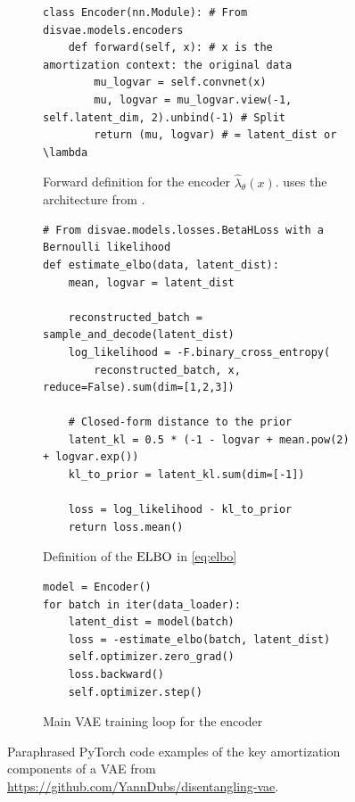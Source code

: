 \begin{figure}
  \centering
\begin{subfigure}[b]{\textwidth}
\begin{lstlisting}
class Encoder(nn.Module): # From disvae.models.encoders
    def forward(self, x): # x is the amortization context: the original data
        mu_logvar = self.convnet(x)
        mu, logvar = mu_logvar.view(-1, self.latent_dim, 2).unbind(-1) # Split
        return (mu, logvar) # = latent_dist or \lambda
\end{lstlisting}
\caption{Forward definition for the encoder $\hat \lambda_\theta(x)$.
   uses the architecture
  from \citet{burgess2018understanding}.}
\label{lst:vae.encoder}
\end{subfigure}
\begin{subfigure}[b]{\textwidth}
\begin{lstlisting}
# From disvae.models.losses.BetaHLoss with a Bernoulli likelihood
def estimate_elbo(data, latent_dist):
    mean, logvar = latent_dist

    reconstructed_batch = sample_and_decode(latent_dist)
    log_likelihood = -F.binary_cross_entropy(
        reconstructed_batch, x, reduce=False).sum(dim=[1,2,3])

    # Closed-form distance to the prior
    latent_kl = 0.5 * (-1 - logvar + mean.pow(2) + logvar.exp())
    kl_to_prior = latent_kl.sum(dim=[-1])

    loss = log_likelihood - kl_to_prior
    return loss.mean()
\end{lstlisting}
\caption{Definition of the $\operatorname{ELBO}$ in \cref{eq:elbo}}
\label{lst:vae.elbo}
\end{subfigure}

\begin{subfigure}[b]{\textwidth}
\begin{lstlisting}
model = Encoder()
for batch in iter(data_loader):
    latent_dist = model(batch)
    loss = -estimate_elbo(batch, latent_dist)
    self.optimizer.zero_grad()
    loss.backward()
    self.optimizer.step()
\end{lstlisting}
\caption{Main VAE training loop for the encoder}
\label{lst:vae.loop}
\end{subfigure}

\caption{Paraphrased PyTorch code examples of the key
  amortization components of a VAE from
  \url{https://github.com/YannDubs/disentangling-vae}.}
\label{lst:vae}
\end{figure}

